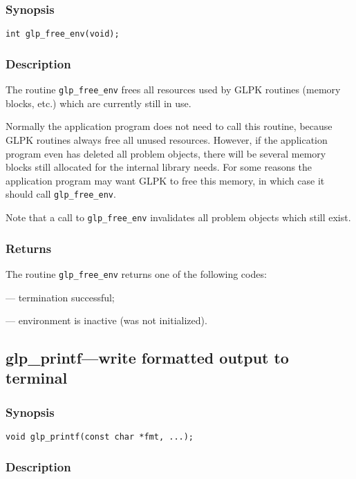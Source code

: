 \subsubsection*{Synopsis}

\begin{verbatim}
int glp_free_env(void);
\end{verbatim}

\subsubsection*{Description}

The routine \verb|glp_free_env| frees all resources used by GLPK
routines (memory blocks, etc.) which are currently still in use.

Normally the application program does not need to call this routine,
because GLPK routines always free all unused resources. However, if
the application program even has deleted all problem objects, there
will be several memory blocks still allocated for the internal library
needs. For some reasons the application program may want GLPK to free
this memory, in which case it should call \verb|glp_free_env|.

Note that a call to \verb|glp_free_env| invalidates all problem objects
which still exist.

\subsubsection*{Returns}

The routine \verb|glp_free_env| returns one of the following codes:

 --- termination successful;

 --- environment is inactive (was not initialized).

\subsection{glp\_printf---write formatted output to terminal}

\subsubsection*{Synopsis}

\begin{verbatim}
void glp_printf(const char *fmt, ...);
\end{verbatim}

\subsubsection*{Description}

